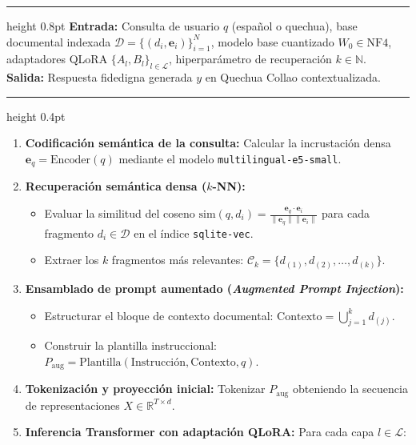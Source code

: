 \begin{algoritmo}[H]
\centering
\begin{minipage}{0.96\textwidth}
\vspace{2pt}\hrule height 0.8pt\vspace{4pt}
\small
\textbf{Entrada:} Consulta de usuario $q$ (español o quechua), base documental indexada $\mathcal{D} = \{(d_i, \mathbf{e}_i)\}_{i=1}^N$, modelo base cuantizado $W_0 \in \text{NF4}$, adaptadores QLoRA $\{A_l, B_l\}_{l \in \mathcal{L}}$, hiperparámetro de recuperación $k \in \mathbb{N}$.\\
\textbf{Salida:} Respuesta fidedigna generada $y$ en Quechua Collao contextualizada.
\vspace{3pt}\hrule height 0.4pt\vspace{4pt}
\begin{enumerate}[1.]
    \item \textbf{Codificación semántica de la consulta:} Calcular la incrustación densa $\mathbf{e}_q = \text{Encoder}(q)$ mediante el modelo \texttt{multilingual-e5-small}.
    \item \textbf{Recuperación semántica densa ($k$-NN):}
    \begin{itemize}
        \item Evaluar la similitud del coseno $\text{sim}(q, d_i) = \frac{\mathbf{e}_q \cdot \mathbf{e}_i}{\|\mathbf{e}_q\| \|\mathbf{e}_i\|}$ para cada fragmento $d_i \in \mathcal{D}$ en el índice \texttt{sqlite-vec}.
        \item Extraer los $k$ fragmentos más relevantes: $\mathcal{C}_k = \{d_{(1)}, d_{(2)}, \dots, d_{(k)}\}$.
    \end{itemize}
    \item \textbf{Ensamblado de prompt aumentado (\textit{Augmented Prompt Injection}):}
    \begin{itemize}
        \item Estructurar el bloque de contexto documental: $\text{Contexto} = \bigcup_{j=1}^k d_{(j)}$.
        \item Construir la plantilla instruccional: $P_{\text{aug}} = \text{Plantilla}(\text{Instrucción}, \text{Contexto}, q)$.
    \end{itemize}
    \item \textbf{Tokenización y proyección inicial:} Tokenizar $P_{\text{aug}}$ obteniendo la secuencia de representaciones $X \in \mathbb{R}^{T \times d}$.
    \item \textbf{Inferencia Transformer con adaptación QLoRA:} Para cada capa $l \in \mathcal{L}$:

\end{enumerate}
\end{minipage}
\end{algoritmo}

